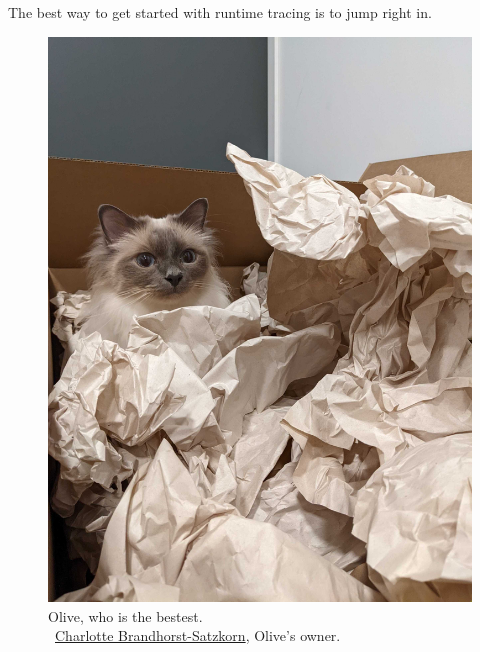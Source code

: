 \documentclass[10pt,letterpaper,oneside,openany,english]{memoir}
\begin{document}
The best way to get started with runtime tracing is to jump right in.
\enlargethispage{3\baselineskip}
\begin{figure}[h!]
  \centering
  \includegraphics[width=0.6\textheight]{images/olive.jpg}
  \caption*{Olive, who is the bestest.\\\textcopyright{}~\href{https://catzkorn.dev/}{Charlotte Brandhorst-Satzkorn}, Olive's owner.}
\end{figure}


\backmatter

\printbibliography
\end{document}
